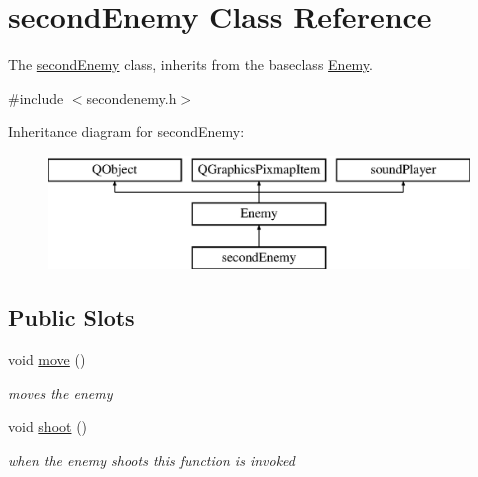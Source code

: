 \hypertarget{classsecondEnemy}{}\section{second\+Enemy Class Reference}
\label{classsecondEnemy}


The \hyperlink{classsecondEnemy}{second\+Enemy} class, inherits from the baseclass \hyperlink{classEnemy}{Enemy}.  




{\ttfamily \#include $<$secondenemy.\+h$>$}

Inheritance diagram for second\+Enemy\+:\begin{figure}[H]
\begin{center}
\leavevmode
\includegraphics[height=3.000000cm]{classsecondEnemy}
\end{center}
\end{figure}
\subsection*{Public Slots}
\begin{DoxyCompactItemize}
\item 
\mbox{\label{classsecondEnemy_a08d9487c6e04c4e7da2ba1353c000de8}} 
void \hyperlink{classsecondEnemy_a08d9487c6e04c4e7da2ba1353c000de8}{move} ()
\begin{DoxyCompactList}\small\item\em moves the enemy \end{DoxyCompactList}\item 
\mbox{\label{classsecondEnemy_a592a963fc521a4073acfb3d320179383}} 
void \hyperlink{classsecondEnemy_a592a963fc521a4073acfb3d320179383}{shoot} ()
\begin{DoxyCompactList}\small\item\em when the enemy shoots this function is invoked \end{DoxyCompactList}\end{DoxyCompactItemize}
